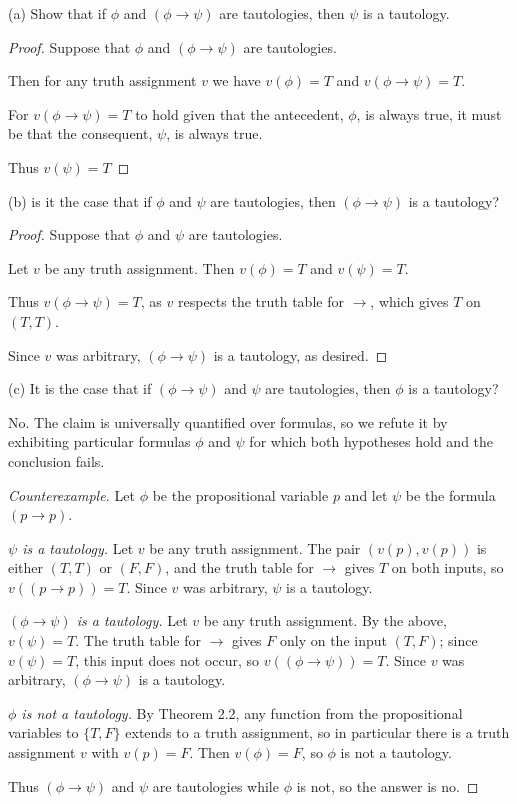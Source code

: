 \documentclass{article}
\theoremstyle{remark}\newtheorem{remark}{Remark}
\begin{document}
(a) Show that if $\phi$ and $(\phi \rightarrow \psi)$ are tautologies, then $\psi$ is a tautology.
\begin{proof}
    Suppose that $\phi$ and $(\phi \rightarrow \psi)$ are tautologies.

    Then for any truth assignment $v$ we have $v(\phi) = T$ and $v(\phi \rightarrow \psi) = T$.

    For $v(\phi \rightarrow \psi) = T$ to hold given that the antecedent, $\phi$, is always true, it must be that the consequent, $\psi$, is always true.

    Thus $v(\psi) = T$
\end{proof}

(b) is it the case that if $\phi$ and $\psi$ are tautologies, then $(\phi \rightarrow \psi)$ is a tautology?

\begin{proof}
    Suppose that $\phi$ and $\psi$ are tautologies.

    Let $v$ be any truth assignment. Then $v(\phi) = T$ and $v(\psi) = T$.

    Thus $v(\phi \rightarrow \psi) = T$, as $v$ respects the truth table for $\rightarrow$, which gives $T$ on $(T, T)$.

    Since $v$ was arbitrary, $(\phi \rightarrow \psi)$ is a tautology, as desired.
\end{proof}

(c) It is the case that if $(\phi \rightarrow \psi)$ and $\psi$ are tautologies, then $\phi$ is a tautology?

No. The claim is universally quantified over formulas, so we refute it by
exhibiting particular formulas $\phi$ and $\psi$ for which both hypotheses
hold and the conclusion fails.

\begin{proof}[Counterexample]
    Let $\phi$ be the propositional variable $p$ and let $\psi$ be the
    formula $(p \rightarrow p)$.

    \emph{$\psi$ is a tautology.} Let $v$ be any truth assignment. The pair
    $(v(p), v(p))$ is either $(T, T)$ or $(F, F)$, and the truth table for
    $\rightarrow$ gives $T$ on both inputs, so $v((p \rightarrow p)) = T$.
    Since $v$ was arbitrary, $\psi$ is a tautology.

    \emph{$(\phi \rightarrow \psi)$ is a tautology.} Let $v$ be any truth
    assignment. By the above, $v(\psi) = T$. The truth table for
    $\rightarrow$ gives $F$ only on the input $(T, F)$; since $v(\psi) = T$,
    this input does not occur, so $v((\phi \rightarrow \psi)) = T$. Since
    $v$ was arbitrary, $(\phi \rightarrow \psi)$ is a tautology.

    \emph{$\phi$ is not a tautology.} By Theorem 2.2, any function from the
    propositional variables to $\{T, F\}$ extends to a truth assignment, so
    in particular there is a truth assignment $v$ with $v(p) = F$. Then
    $v(\phi) = F$, so $\phi$ is not a tautology.

    Thus $(\phi \rightarrow \psi)$ and $\psi$ are tautologies while $\phi$
    is not, so the answer is no.
\end{proof}
\end{document}
